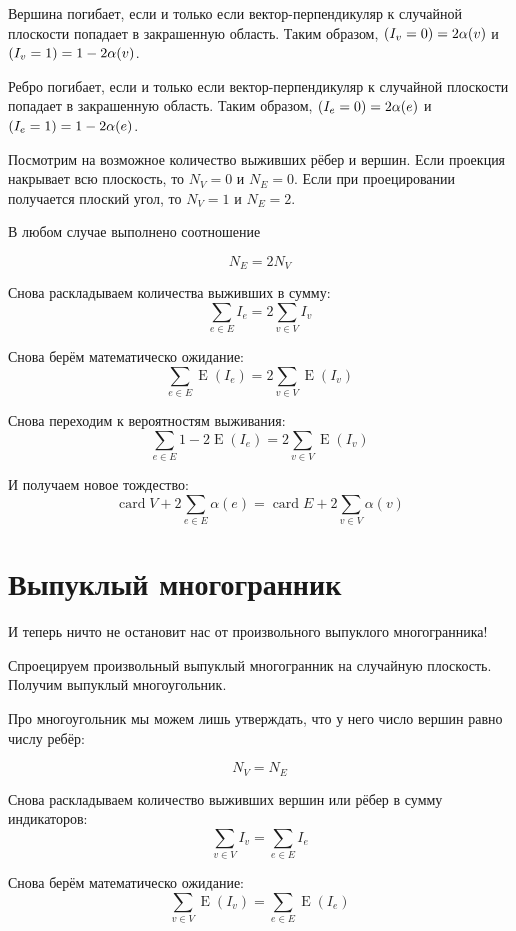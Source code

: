 \documentclass[12pt]{article} %
\theoremstyle{definition} %
\DeclareMathOperator{\E}{E}
\DeclareMathOperator{\card}{card}
\let\P\relax
\DeclareMathOperator{\P}{P}
\begin{document}
Вершина погибает, если и только если вектор-перпендикуляр к случайной плоскости попадает в закрашенную область.
Таким образом, $\P(I_v = 0) = 2 \alpha(v)$ и $\P(I_v = 1) = 1 - 2\alpha(v)$.


Ребро погибает, если и только если вектор-перпендикуляр к случайной плоскости попадает в закрашенную область.
Таким образом, $\P(I_e = 0) = 2 \alpha(e)$ и $\P(I_e = 1) = 1 - 2\alpha(e)$.




Посмотрим на возможное количество выживших рёбер и вершин. 
Если проекция накрывает всю плоскость, то $N_V = 0$ и $N_E = 0$.
Если при проецировании получается плоский угол, то $N_V = 1$ и $N_E = 2$.

В любом случае выполнено соотношение

\[
N_E = 2 N_V
\]


Снова раскладываем количества выживших в сумму:
\[
\sum_{e\in E} I_e = 2\sum_{v\in V} I_v
\]

Снова берём математическо ожидание:
\[
\sum_{e\in E} \E(I_e) = 2\sum_{v\in V} \E(I_v)
\]

Снова переходим к вероятностям выживания:
\[
\sum_{e\in E} 1-2\E(I_e) = 2\sum_{v\in V} \E(I_v)
\]

И получаем новое тождество:
\[
\card V + 2\sum_{e\in E} \alpha(e) = \card E + 2\sum_{v\in V} \alpha(v)
\]





\section{Выпуклый многогранник}


И теперь ничто не остановит нас от произвольного выпуклого многогранника!


Спроецируем произвольный выпуклый многогранник на случайную плоскость.
Получим выпуклый многоугольник. 


Про многоугольник мы можем лишь утверждать, 
что у него число вершин равно числу ребёр:

\[
N_V = N_E
\]

Снова раскладываем количество выживших вершин или рёбер в сумму индикаторов:
\[
\sum_{v\in V} I_v = \sum_{e\in E} I_e
\]

Снова берём математическо ожидание:
\[
\sum_{v\in V} \E(I_v) = \sum_{e\in E} \E(I_e)
\]
\end{document}
